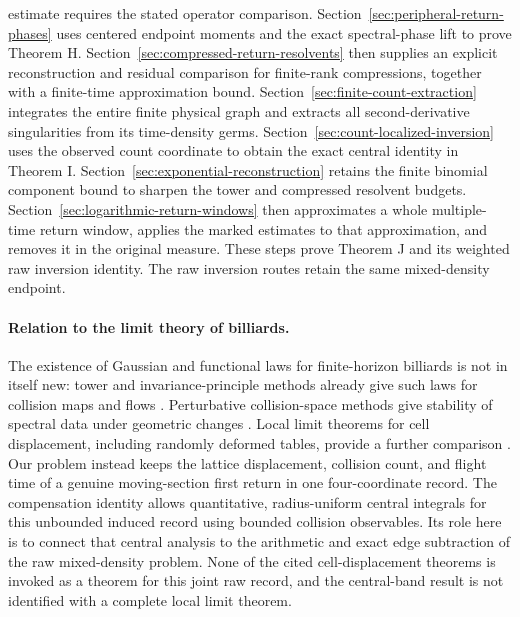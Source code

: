 \documentclass[11pt,reqno]{amsart}
\numberwithin{equation}{section}
\theoremstyle{definition}\newtheorem{definition}[theorem]{Definition}
\theoremstyle{remark}\newtheorem{remark}[theorem]{Remark}
\begin{document}
estimate requires the stated operator comparison.
Section~\ref{sec:peripheral-return-phases} uses centered endpoint
moments and the exact spectral-phase lift to prove Theorem H.
Section~\ref{sec:compressed-return-resolvents} then supplies an explicit
reconstruction and residual comparison for finite-rank compressions,
together with a finite-time approximation bound.
Section~\ref{sec:finite-count-extraction} integrates the entire finite
physical graph and extracts all second-derivative singularities from its
time-density germs. Section~\ref{sec:count-localized-inversion} uses
the observed count coordinate to obtain the exact central identity in
Theorem I. Section~\ref{sec:exponential-reconstruction} retains the
finite binomial component bound to sharpen the tower and compressed
resolvent budgets. Section~\ref{sec:logarithmic-return-windows} then
approximates a whole multiple-time return window, applies the marked
estimates to that approximation, and removes it in the original
measure. These steps prove Theorem J and its weighted raw inversion
identity. The raw inversion routes retain the same mixed-density endpoint.

\paragraph{Relation to the limit theory of billiards.}
The existence of Gaussian and functional laws for finite-horizon
billiards is not in itself new: tower and invariance-principle methods
already give such laws for collision maps and flows
\cite{Young,MN}. Perturbative collision-space methods give stability of
spectral data under geometric changes \cite{DZ}. Local limit theorems
for cell displacement, including randomly deformed tables, provide a
further comparison \cite{SV,DPZ}. Our problem instead keeps the lattice
displacement, collision count, and flight time of a genuine moving-section
first return in one four-coordinate record. The compensation identity
allows quantitative, radius-uniform central integrals for this
unbounded induced record using bounded collision observables. Its role
here is to connect that central analysis to the arithmetic and exact
edge subtraction of the raw mixed-density problem. None of the cited
cell-displacement theorems is invoked as a theorem for this joint raw
record, and the central-band result is not identified with a complete
local limit theorem.


















\end{document}
